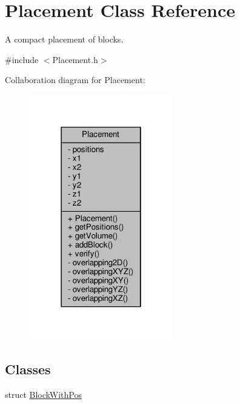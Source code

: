 \hypertarget{classPlacement}{}\section{Placement Class Reference}
\label{classPlacement}


A compact placement of blocks.  




{\ttfamily \#include $<$Placement.\+h$>$}



Collaboration diagram for Placement\+:\nopagebreak
\begin{figure}[H]
\begin{center}
\leavevmode
\includegraphics[width=178pt]{classPlacement__coll__graph}
\end{center}
\end{figure}
\subsection*{Classes}
\begin{DoxyCompactItemize}
\item 
struct \hyperlink{structPlacement_1_1BlockWithPos}{Block\+With\+Pos}
\end{DoxyCompactItemize}
